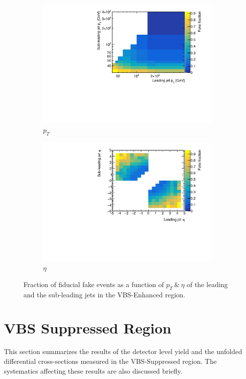 \begin{figure}[htb]
    \centering
    \begin{subfigure}{.48\textwidth}
        \centering
        \includegraphics[width=.9\linewidth]{figures/Analysis/Unfolding/FakeFraction_pt_jets.pdf}
        \caption{ $p_{T}$}
    \end{subfigure}
    \begin{subfigure}{.48\textwidth}
        \centering
        \includegraphics[width=.9\linewidth]{figures/Analysis/Unfolding/FakeFraction_eta_jets.pdf}
        \caption{$\eta$}
    \end{subfigure}
    \caption{ Fraction of fiducial fake events as a function of $p_{T}~\&~\eta$ of the leading and the sub-leading jets in the VBS-Enhanced region.\label{fig:fake_fraction_jets}}
\end{figure}

\section{VBS Suppressed Region}
\label{Appendix:VBSSupRegion}
This section summarizes the results of the detector level yield and the unfolded differential cross-sections measured in the VBS-Suppressed region. The systematics affecting these results are also discussed briefly.

